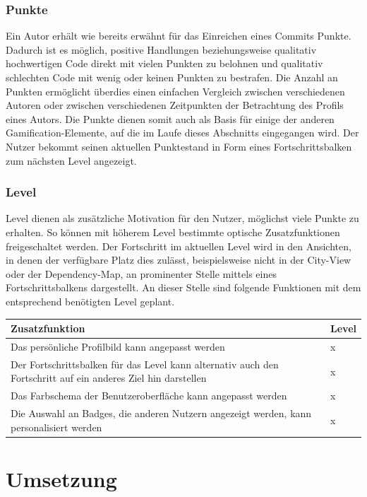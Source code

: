 \documentclass[
	oneside,  %
	ngerman, 
	final, 
	11pt, 
	a4paper, 
	1.1headlines, 
	headinclude=false, 
	footinclude=false, 
	mpinclude=false, 
	pagesize, 
	onecolumn, 
	titlepage, 
	parskip=half, 
	headsepline, 
	chapterprefix=false, 
	version=first, 
	listof=totoc, 
	bibliography=totoc, 
	toc=graduated, 
	fleqn
]{scrbook}
\begin{document}
\subsection{Punkte}
\label{coderadar_Punkte}
Ein Autor erhält wie bereits erwähnt für das Einreichen eines Commits Punkte.
Dadurch ist es möglich, positive Handlungen beziehungsweise qualitativ hochwertigen Code direkt mit vielen Punkten zu belohnen und qualitativ schlechten Code mit wenig oder keinen Punkten zu bestrafen.
Die Anzahl an Punkten ermöglicht überdies einen einfachen Vergleich zwischen verschiedenen Autoren oder zwischen verschiedenen Zeitpunkten der Betrachtung des Profils eines Autors.
Die Punkte dienen somit auch als Basis für einige der anderen Gamification-Elemente, auf die im Laufe dieses Abschnitts eingegangen wird.
Der Nutzer bekommt seinen aktuellen Punktestand in Form eines Fortschrittsbalken zum nächsten Level angezeigt.

\subsection{Level}
\label{coderadar_Level}
Level dienen als zusätzliche Motivation für den Nutzer, möglichst viele Punkte zu erhalten.
So können mit höherem Level bestimmte optische Zusatzfunktionen freigeschaltet werden.
Der Fortschritt im aktuellen Level wird in den Ansichten, in denen der verfügbare Platz dies zulässt, beispielsweise nicht in der City-View oder der Dependency-Map, an prominenter Stelle mittels eines Fortschrittsbalkens dargestellt.
An dieser Stelle sind folgende Funktionen mit dem entsprechend benötigten Level geplant.

\begin{center}
	\begin{tabular}{|p{12cm}|p{1cm}|}
		\hline
		Zusatzfunktion & Level \\ \hline
		Das persönliche Profilbild kann angepasst werden & x \\ \hline
		Der Fortschrittsbalken für das Level kann alternativ auch den Fortschritt auf ein anderes Ziel hin darstellen & x \\ \hline
		Das Farbschema der Benutzeroberfläche kann angepasst werden & x \\ \hline
		Die Auswahl an Badges, die anderen Nutzern angezeigt werden, kann personalisiert werden & x \\ \hline
	\end{tabular}
\end{center}

\chapter{Umsetzung}
\label{Umsetzung}
\end{document}
